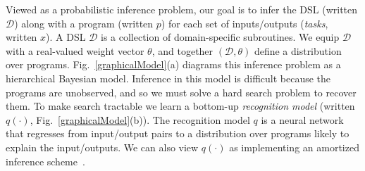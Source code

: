 \documentclass{article}
\newcommand{\system}{\textsc{DreamCoder}~}
\begin{document}









Viewed as a probabilistic inference problem,
our goal is to infer the DSL (written $\mathcal{D}$)
along with a program (written $p$) for each set of inputs/outputs (\emph{tasks}, written $x$).
A DSL $\mathcal{D}$ is a collection of domain-specific subroutines.
We equip $\mathcal{D}$ with a real-valued weight vector $\theta$, and together
$(\mathcal{D},\theta)$ define a distribution over programs.
Fig.~\ref{graphicalModel}(a) diagrams this inference problem as a hierarchical Bayesian model.
Inference in this model is
difficult because the programs are unobserved,
and so we must solve a hard search problem to recover them. To make
search tractable we learn a bottom-up \emph{recognition
  model} (written $q(\cdot )$, Fig.~\ref{graphicalModel}(b)).
The recognition model $q$ is a neural
network that regresses from input/output pairs to a distribution over
programs likely to explain the input/outputs. We can also view $q(\cdot )$ as implementing an amortized
inference
scheme~\cite{le2016inference}.
\end{document}
